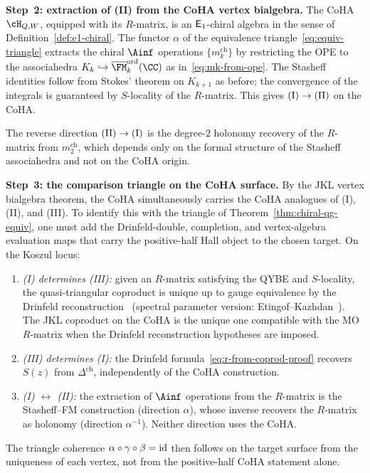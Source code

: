 \begin{remark}
\smallskip
\noindent\textbf{Step~2: extraction of (II) from the CoHA
vertex bialgebra.}
The CoHA $\cH_{Q,W}$, equipped with its $R$-matrix, is an
$\mathsf{E}_1$-chiral algebra in the sense of
Definition~\ref{def:e1-chiral}. The functor $\alpha$
of the equivalence triangle~\eqref{eq:equiv-triangle}
extracts the chiral $\Ainf$ operations
$\{m_k^{\mathrm{ch}}\}$ by restricting the OPE to the
associahedra
$K_k \hookrightarrow
\overline{\FM}_k^{\mathrm{ord}}(\CC)$ as
in~\eqref{eq:mk-from-ope}. The Stasheff identities follow
from Stokes' theorem on $K_{k+1}$ as before; the
convergence of the integrals is guaranteed by
$S$-locality of the $R$-matrix. This gives
$\textup{(I)} \to \textup{(II)}$ on the CoHA.

The reverse direction $\textup{(II)} \to \textup{(I)}$ is the
degree-$2$ holonomy recovery of the $R$-matrix from
$m_2^{\mathrm{ch}}$, which depends only on the formal
structure of the Stasheff associahedra and not on the CoHA
origin.

\smallskip
\noindent\textbf{Step~3: the comparison triangle on the CoHA surface.}
By the JKL vertex bialgebra theorem, the CoHA
simultaneously carries the CoHA analogues of (I), (II), and
(III). To identify this with the triangle of
Theorem~\ref{thm:chiral-qg-equiv}, one must add the
Drinfeld-double, completion, and vertex-algebra evaluation maps
that carry the positive-half Hall object to the chosen target.
On the Koszul
locus:
\begin{enumerate}[label=\textup{(\roman*)}]
\item \emph{(I) determines (III):} given an $R$-matrix
 satisfying the QYBE and $S$-locality, the quasi-triangular
 coproduct is unique up to gauge equivalence by the
 Drinfeld reconstruction~\cite{Drinfeld90}
 (spectral parameter version:
 Etingof--Kazhdan~\cite{EK96}). The JKL coproduct on the
 CoHA is the unique one compatible with the MO $R$-matrix
 when the Drinfeld reconstruction hypotheses are imposed.
\item \emph{(III) determines (I):} the Drinfeld
 formula~\eqref{eq:r-from-coprod-proof} recovers $S(z)$
 from $\Delta^{\mathrm{ch}}$, independently of the CoHA
 construction.
\item \emph{(I) $\leftrightarrow$ (II):} the extraction of
 $\Ainf$ operations from the $R$-matrix is the
 Stasheff--FM construction (direction $\alpha$), whose
 inverse recovers the $R$-matrix as holonomy (direction
 $\alpha^{-1}$). Neither direction uses the CoHA.
\end{enumerate}
The triangle coherence
$\alpha \circ \gamma \circ \beta = \mathrm{id}$ then follows on the
target surface from the uniqueness of each vertex, not from the
positive-half CoHA statement alone.


\end{remark}
